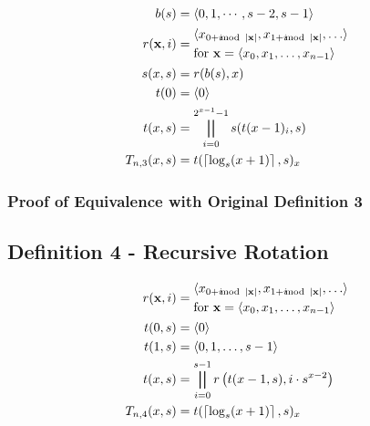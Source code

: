 \documentclass[conference]{IEEEtran}
\begin{document}

\begin{equation}
    \label{eq:pnd03}
    \begin{aligned}
            b(s) &= \tuple{0, 1, \cdots, s - 2, s - 1} \\
r(\mathbf{x}, i) &= \begin{aligned}[c]
                   &\tuple{x_{0 + i \mod{|\mathbf{x}|}}, x_{1 + i \mod{|\mathbf{x}|}}, \ldots} \\
                   &\text{for } \mathbf{x} = \tuple{x_0, x_1, \ldots, x_{n-1}}
        \end{aligned} \\
         s(x, s) &= r(b(s), x) \\
            t(0) &= \tuple{0} \\
         t(x, s) &= \bigparallel_{i=0}^{2^{x-1}-1} s(t(x-1)_i, s)  \\
   T_{n,3}(x, s) &= t(\ceil{\log_s(x + 1)}, s)_x
    \end{aligned}
\end{equation}

\subsubsection{Proof of Equivalence with Original Definition 3}

\subsection{Definition 4 - Recursive Rotation}

\begin{equation}
    \label{eq:pnd04}
    \begin{aligned}
r(\mathbf{x}, i) &= \begin{aligned}[c]
                   &\tuple{x_{0 + i \mod{|\mathbf{x}|}}, x_{1 + i \mod{|\mathbf{x}|}}, \ldots} \\
                   &\text{for } \mathbf{x} = \tuple{x_0, x_1, \ldots, x_{n-1}}
        \end{aligned} \\
         t(0, s) &= \tuple{0} \\
         t(1, s) &= \tuple{0, 1, \ldots, s - 1} \\
         t(x, s) &= \bigparallel_{i=0}^{s-1} r\left(t(x-1, s), i \cdot s^{x-2}\right) \\
   T_{n,4}(x, s) &= t(\ceil{\log_s(x + 1)}, s)_x
    \end{aligned}
\end{equation}
\end{document}
